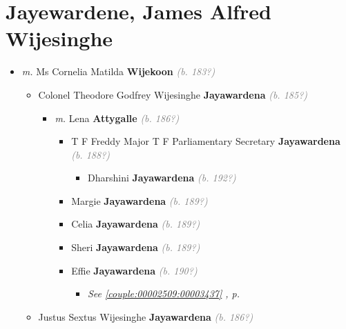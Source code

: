 \documentclass[10pt, openany]{book}
\begin{document}
\chapter{Jayewardene, James Alfred Wijesinghe}
\label{00002604}
\textcolor{slmaroon}{\textit{}}
\begin{itemize}
\item{\textit{m.} Ms Cornelia Matilda \textbf{Wijekoon} \textcolor{gray}{\textit{(b. 183?)}}   \label{couple:00002604:00003430} \begin{itemize}
\item{Colonel Theodore Godfrey Wijesinghe \textbf{Jayawardena} \textcolor{gray}{\textit{(b. 185?)}}
\begin{itemize}
\item{\textit{m.} Lena \textbf{Attygalle} \textcolor{gray}{\textit{(b. 186?)}}   \label{couple:00003432:00003433} \begin{itemize}
\item{T F Freddy Major T F Parliamentary Secretary \textbf{Jayawardena} \textcolor{gray}{\textit{(b. 188?)}}
\begin{itemize}
\item{Dharshini \textbf{Jayawardena} \textcolor{gray}{\textit{(b. 192?)}}
 }
\end{itemize}
        }
\item{Margie \textbf{Jayawardena} \textcolor{gray}{\textit{(b. 189?)}}
 }
\item{Celia \textbf{Jayawardena} \textcolor{gray}{\textit{(b. 189?)}}
 }
\item{Sheri \textbf{Jayawardena} \textcolor{gray}{\textit{(b. 189?)}}
 }
\item{Effie \textbf{Jayawardena} \textcolor{gray}{\textit{(b. 190?)}}
\begin{itemize}
\item{\textcolor{slteal}{\textit{See  \autoref{couple:00002509:00003437} \textit{, p. \pageref{couple:00002509:00003437} }}}}
\end{itemize}
 }
\end{itemize}}
\end{itemize}
    }
\item{Justus Sextus Wijesinghe \textbf{Jayawardena} \textcolor{gray}{\textit{(b. 186?)}}
}
\end{itemize}}
\end{itemize}
\end{document}
